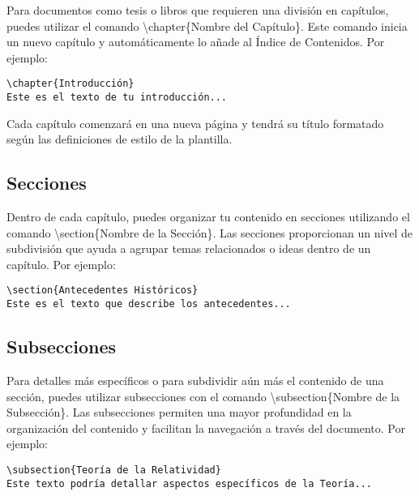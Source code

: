 \documentclass[11pt]{article}
\begin{document}
Para documentos como tesis o libros que requieren una división en capítulos, puedes utilizar el comando \textbackslash chapter\{Nombre del Capítulo\}. Este comando inicia un nuevo capítulo y automáticamente lo añade al Índice de Contenidos. Por ejemplo:

\begin{verbatim}
\chapter{Introducción}
Este es el texto de tu introducción...
\end{verbatim}

Cada capítulo comenzará en una nueva página y tendrá su título formatado según las definiciones de estilo de la plantilla.

\subsection{Secciones}

Dentro de cada capítulo, puedes organizar tu contenido en secciones utilizando el comando \textbackslash section\{Nombre de la Sección\}. Las secciones proporcionan un nivel de subdivisión que ayuda a agrupar temas relacionados o ideas dentro de un capítulo. Por ejemplo:

\begin{verbatim}
\section{Antecedentes Históricos}
Este es el texto que describe los antecedentes...
\end{verbatim}

\subsection{Subsecciones}

Para detalles más específicos o para subdividir aún más el contenido de una sección, puedes utilizar subsecciones con el comando \textbackslash subsection\{Nombre de la Subsección\}. Las subsecciones permiten una mayor profundidad en la organización del contenido y facilitan la navegación a través del documento. Por ejemplo:

\begin{verbatim}
\subsection{Teoría de la Relatividad}
Este texto podría detallar aspectos específicos de la Teoría...
\end{verbatim}
\end{document}
